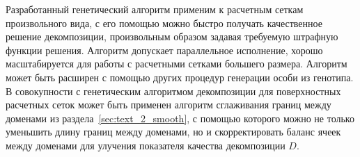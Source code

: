 Разработанный генетический алгоритм применим к расчетным сеткам произвольного вида, с его помощью можно быстро получать качественное решение декомпозиции, произвольным образом задавая требуемую штрафную функции решения.
Алгоритм допускает параллельное исполнение, хорошо масштабируется для работы с расчетными сетками большего размера.
Алгоритм может быть расширен с помощью других процедур генерации особи из генотипа.
В совокупности с генетическим алгоритмом декомпозиции для поверхностных расчетных сеток\label{term:unstruct_surf_calc_mesh5} может быть применен алгоритм сглаживания границ между доменами\label{term:alg_smooth_domains_border2} из раздела~\ref{sec:text_2_smooth}, с помощью которого можно не только уменьшить длину границ между доменами, но и скорректировать баланс ячеек между доменами для улучения показателя качества декомпозиции $D$.\label{term:decomp_neravn7}
